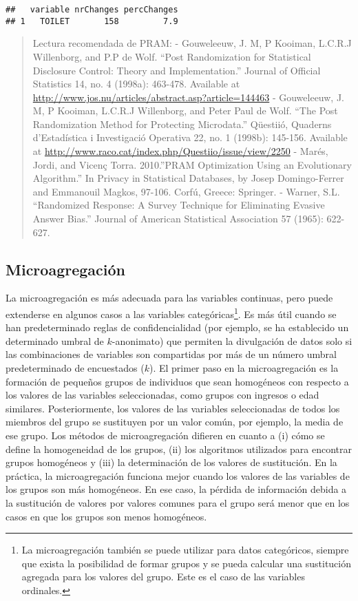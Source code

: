 \documentclass[
]{book}
\theoremstyle{definition}
\theoremstyle{definition}
\theoremstyle{definition}
\theoremstyle{definition}
\theoremstyle{remark}
\begin{document}
\begin{verbatim}
##   variable nrChanges percChanges
## 1   TOILET       158         7.9
\end{verbatim}

\begin{quote}
Lectura recomendada de PRAM:
- Gouweleeuw, J. M, P Kooiman, L.C.R.J Willenborg, and P.P de Wolf. ``Post Randomization for Statistical Disclosure Control: Theory and Implementation.'' Journal of Official Statistics 14, no. 4 (1998a): 463-478. Available at \url{http://www.jos.nu/articles/abstract.asp?article=144463}
- Gouweleeuw, J. M, P Kooiman, L.C.R.J Willenborg, and Peter Paul de Wolf. ``The Post Randomization Method for Protecting Microdata.'' Qüestiió, Quaderns d'Estadística i Investigació Operativa 22, no. 1 (1998b): 145-156. Available at \url{http://www.raco.cat/index.php/Questiio/issue/view/2250}
- Marés, Jordi, and Vicenç Torra. 2010.''PRAM Optimization Using an Evolutionary Algorithm.'' In Privacy in Statistical Databases, by Josep Domingo-Ferrer and Emmanouil Magkos, 97-106. Corfú, Greece: Springer.
- Warner, S.L. ``Randomized Response: A Survey Technique for Eliminating Evasive Answer Bias.'' Journal of American Statistical Association 57 (1965): 622-627.
\end{quote}

\hypertarget{microagregaciuxf3n}{%
\subsection{Microagregación}\label{microagregaciuxf3n}}

La microagregación es más adecuada para las variables continuas, pero puede extenderse en algunos casos a las variables categóricas\footnote{La microagregación también se puede utilizar para datos categóricos, siempre que exista la posibilidad de formar grupos y se pueda calcular una sustitución agregada para los valores del grupo. Este es el caso de las variables ordinales.}. Es más útil cuando se han predeterminado reglas de confidencialidad (por ejemplo, se ha establecido un determinado umbral de \(k\)-anonimato) que permiten la divulgación de datos solo si las combinaciones de variables son compartidas por más de un número umbral predeterminado de encuestados (\(k\)). El primer paso en la microagregación es la formación de pequeños grupos de individuos que sean homogéneos con respecto a los valores de las variables seleccionadas, como grupos con ingresos o edad similares. Posteriormente, los valores de las variables seleccionadas de todos los miembros del grupo se sustituyen por un valor común, por ejemplo, la media de ese grupo. Los métodos de microagregación difieren en cuanto a (i) cómo se define la homogeneidad de los grupos, (ii) los algoritmos utilizados para encontrar grupos homogéneos y (iii) la determinación de los valores de sustitución. En la práctica, la microagregación funciona mejor cuando los valores de las variables de los grupos son más homogéneos. En ese caso, la pérdida de información debida a la sustitución de valores por valores comunes para el grupo será menor que en los casos en que los grupos son menos homogéneos.
\end{document}
